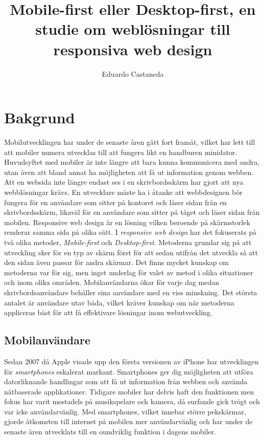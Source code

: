 \documentclass[11pt]{article}
\title{Mobile-first eller Desktop-first, en studie om weblösningar till responsiva web design}
\author{Eduardo Castaneda}
\begin{document}
\maketitle                  %

\newpage

\tableofcontents
\newpage



\section{Bakgrund}

Mobilutvecklingen har under de senaste åren gått fort framåt, vilket har lett till att mobiler numera utvecklas till att fungera likt en handburen minidator. Huvudsyftet med mobiler är inte längre att bara kunna kommunicera med andra, utan även att bland annat ha möjligheten att få ut information genom webben. Att en websida inte längre endast ses i en skrivbordsskärm har gjort att nya webblösningar krävs. En utvecklare måste ha i åtanke att webbdesignen bör fungera för en användare som sitter på kontoret och läser sidan från en skrivbordsskärm, likaväl för en användare som sitter på tåget och läser sidan från mobilen. Responsive web design är en lösning vilken beroende på skärmstorlek renderar samma sida på olika sätt. I \textit{responsive web design} har det fokuserats på två olika metoder, \textit{Mobile-first} och \textit{Desktop-first}. Metoderna grundar sig på att utveckling sker för en typ av skärm först för att sedan utifrån det utveckla så att den sidan även passar för andra skärmar. Det finns mycket kunskap om metoderna var för sig, men inget underlag för valet av metod i olika situationer och inom olika områden. Mobilanvändarna ökar för varje dag medan skrivbordsanvändare behåller sina användare med en viss minskning. Det största antalet är användare utav båda, vilket kräver kunskap om när metoderna appliceras bäst för att få effektivare lösningar inom webutveckling.

\subsection{Mobilanvändare}

Sedan 2007 då Apple visade upp den första versionen av iPhone har utvecklingen för \textit{smartphones} eskalerat markant. Smartphones ger dig möjligheten att utföra datorliknande handlingar som att få ut information från webben och använda nätbaserade applikationer. Tidigare mobiler har delvis haft den funktionen men fokus har varit mestadels på musikspelare och kamera, då surfande gick trögt och var icke användarvänlig.
Med smartphones, vilket innebar större pekskärmar, gjorde åtkomsten till internet på mobilen mer användarvänlig och har under de senaste åren utvecklats till en oundviklig funktion i dagens mobiler.
\end{document}
